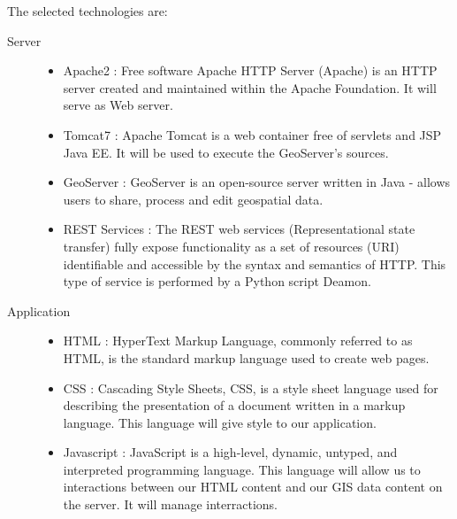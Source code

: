 The selected technologies are:

\begin{description}

  \item[Server] \hfill 
    \begin{itemize}
      \item Apache2 : Free software Apache HTTP Server (Apache) is an HTTP server created and maintained within the Apache Foundation. It will serve as Web server.
      \item Tomcat7 : Apache Tomcat is a web container free of servlets and JSP Java EE. It will be used to execute the GeoServer's sources.
      \item GeoServer : GeoServer is an open-source server written in Java - allows users to share, process and edit geospatial data.
      \item REST Services : The REST web services (Representational state transfer) fully expose functionality as a set of resources (URI) identifiable and accessible by the syntax and semantics of HTTP. This type of service is performed by a Python script Deamon.
    \end{itemize}

  \item[Application] \hfill 
    \begin{itemize}
      \item HTML : HyperText Markup Language, commonly referred to as HTML, is the standard markup language used to create web pages.
      \item CSS : Cascading Style Sheets, CSS, is a style sheet language used for describing the presentation of a document written in a markup language. This language will give style to our application.
      \item Javascript : JavaScript is a high-level, dynamic, untyped, and interpreted programming language. This language will allow us to interactions between our HTML content and our GIS data content on the server. It will manage interractions.
    \end{itemize}


\end{description}
